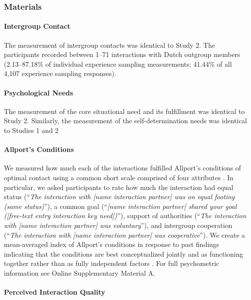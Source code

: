 \subsubsection{Materials}

\paragraph{Intergroup Contact}

The measurement of intergroup contacts was identical to Study 2. The
participants recorded between 1--71 interactions with Dutch outgroup
members (2.13--87.18\% of individual experience sampling measurements;
41.44\% of all 4,107 experience sampling responses).

\paragraph{Psychological Needs}

The measurement of the core situational need and its fulfillment was
identical to Study 2. Similarly, the measurement of the
self-determination needs was identical to Studies 1 and 2

\paragraph{Allport's Conditions}

We measured how much each of the interactions fulfilled Allport's
conditions of optimal contact using a common short scale comprised of
four attributes \citep{Islam1993, Voci2003, AlRamiah2012a, Dixon2005}.
In particular, we asked participants to rate how much the interaction
had equal status
(``\textit{The interaction with [name interaction partner] was on equal footing (same status)}''),
a common goal
(``\textit{[name interaction partner] shared your goal ([free-text entry interaction key need])}''),
support of authorities
(``\textit{The interaction with [name interaction partner] was voluntary}''),
and intergroup cooperation
(``\textit{The interaction with [name interaction partner] was cooperative}'').
We create a mean-averaged index of Allport's conditions in response to
past findings indicating that the conditions are best conceptualized
jointly and as functioning together rather than as fully independent
factors \citep[][, p. 766]{Pettigrew2006}. For full psychometric
information see Online Supplementary Material A.

\paragraph{Perceived Interaction Quality}

